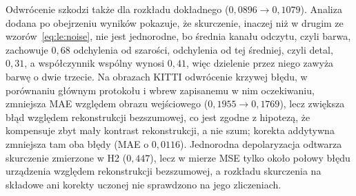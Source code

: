 Odwrócenie szkodzi także dla rozkładu dokładnego ($0{,}0896\to0{,}1079$).
Analiza dodana po obejrzeniu wyników pokazuje, że skurczenie, inaczej niż w drugim ze wzorów~\eqref{eq:le:noise}, nie jest jednorodne, bo średnia kanału odczytu, czyli barwa, zachowuje $0{,}68$ odchylenia od szarości, odchylenia od tej średniej, czyli detal, $0{,}31$, a współczynnik wspólny wynosi $0{,}41$, więc dzielenie przez niego zawyża barwę o dwie trzecie.
Na obrazach KITTI odwrócenie krzywej błędu, w porównaniu głównym protokołu i wbrew zapisanemu w nim oczekiwaniu, zmniejsza MAE względem obrazu wejściowego ($0{,}1955\to0{,}1769$), lecz zwiększa błąd względem rekonstrukcji bezszumowej, co jest zgodne z hipotezą, że kompensuje zbyt mały kontrast rekonstrukcji, a nie szum; korekta addytywna zmniejsza tam oba błędy (MAE o $0{,}0116$).
Jednorodna depolaryzacja odtwarza skurczenie zmierzone w H2 ($0{,}447$), lecz w mierze MSE tylko około połowy błędu urządzenia względem rekonstrukcji bezszumowej, a rozkładu skurczenia na składowe ani korekty uczonej nie sprawdzono na jego zliczeniach.

